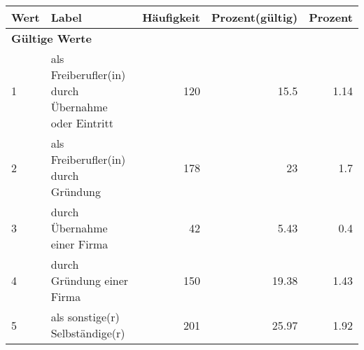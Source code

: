      \begin{longtable}{lXrrr}
     \toprule
     \textbf{Wert} & \textbf{Label} & \textbf{Häufigkeit} & \textbf{Prozent(gültig)} & \textbf{Prozent} \\
     \endhead
     \midrule
     \multicolumn{5}{l}{\textbf{Gültige Werte}}\\

     1 &
     \multicolumn{1}{X}{ als Freiberufler(in) durch Übernahme oder Eintritt   } &


       \num{120} &
       \num[round-mode=places,round-precision=2]{15.5} &
         \num[round-mode=places,round-precision=2]{1.14} \\

     2 &
     \multicolumn{1}{X}{ als Freiberufler(in) durch Gründung   } &


       \num{178} &
       \num[round-mode=places,round-precision=2]{23} &
         \num[round-mode=places,round-precision=2]{1.7} \\

     3 &
     \multicolumn{1}{X}{ durch Übernahme einer Firma   } &


       \num{42} &
       \num[round-mode=places,round-precision=2]{5.43} &
         \num[round-mode=places,round-precision=2]{0.4} \\

     4 &
     \multicolumn{1}{X}{ durch Gründung einer Firma   } &


       \num{150} &
       \num[round-mode=places,round-precision=2]{19.38} &
         \num[round-mode=places,round-precision=2]{1.43} \\

     5 &
     \multicolumn{1}{X}{ als sonstige(r) Selbständige(r)   } &


       \num{201} &
       \num[round-mode=places,round-precision=2]{25.97} &
         \num[round-mode=places,round-precision=2]{1.92} \\


\end{longtable}
